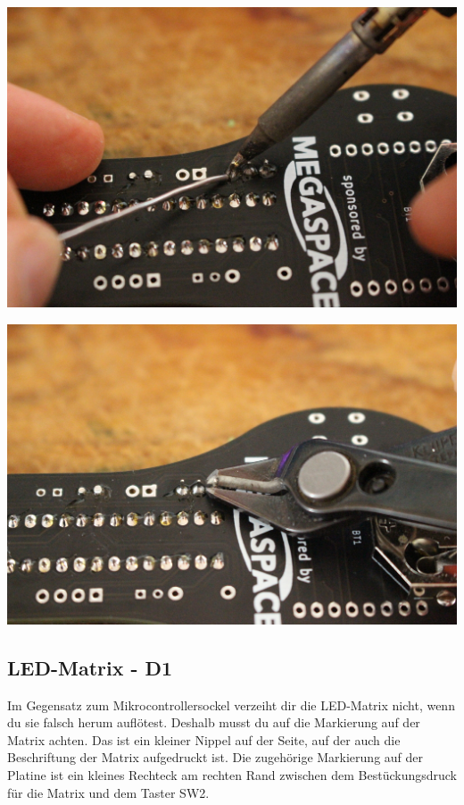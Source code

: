 \documentclass{article}
\begin{document}
\begin{minipage}[b]{0.5\textwidth}
	\includegraphics[width=\textwidth]{Bilder2022/IMG_8223.JPG}
\end{minipage}
\begin{minipage}[b]{0.5\textwidth}
	\includegraphics[width=\textwidth]{Bilder2022/IMG_8224.JPG}
\end{minipage}

\subsection{LED-Matrix - D1}

Im Gegensatz zum Mikrocontrollersockel verzeiht dir die LED-Matrix nicht, wenn du sie falsch herum auflötest. Deshalb musst du auf die Markierung auf der Matrix achten. Das ist ein kleiner Nippel auf der Seite, auf der auch die Beschriftung der Matrix aufgedruckt ist. Die zugehörige Markierung auf der Platine ist ein kleines Rechteck am rechten Rand zwischen dem Bestückungsdruck für die Matrix und dem Taster SW2.
\end{document}
